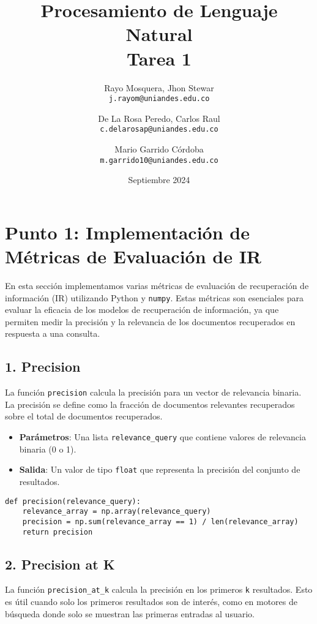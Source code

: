 \documentclass[11pt,english]{article}
\title{Procesamiento de Lenguaje Natural\\
Tarea 1
}
\author{
  Rayo Mosquera, Jhon Stewar\\
  \texttt{j.rayom@uniandes.edu.co}
  \and
  De La Rosa Peredo, Carlos Raul\\
  \texttt{c.delarosap@uniandes.edu.co}\and
  Mario Garrido Córdoba\\
   \texttt{m.garrido10@uniandes.edu.co}
  \\ 
}
\date{Septiembre 2024}
\theoremstyle{plain}
\begin{document}
\maketitle

\section*{Punto 1: Implementación de Métricas de Evaluación de IR}

En esta sección implementamos varias métricas de evaluación de recuperación de información (IR) utilizando Python y \texttt{numpy}. Estas métricas son esenciales para evaluar la eficacia de los modelos de recuperación de información, ya que permiten medir la precisión y la relevancia de los documentos recuperados en respuesta a una consulta.

\subsection*{1. Precision}

La función \texttt{precision} calcula la precisión para un vector de relevancia binaria. La precisión se define como la fracción de documentos relevantes recuperados sobre el total de documentos recuperados.

\begin{itemize}
    \item \textbf{Parámetros}: Una lista \texttt{relevance\_query} que contiene valores de relevancia binaria (0 o 1).
    \item \textbf{Salida}: Un valor de tipo \texttt{float} que representa la precisión del conjunto de resultados.
\end{itemize}

\begin{verbatim}
def precision(relevance_query):
    relevance_array = np.array(relevance_query)
    precision = np.sum(relevance_array == 1) / len(relevance_array)
    return precision
\end{verbatim}

\subsection*{2. Precision at K}

La función \texttt{precision\_at\_k} calcula la precisión en los primeros \texttt{k} resultados. Esto es útil cuando solo los primeros resultados son de interés, como en motores de búsqueda donde solo se muestran las primeras entradas al usuario.
\end{document}
